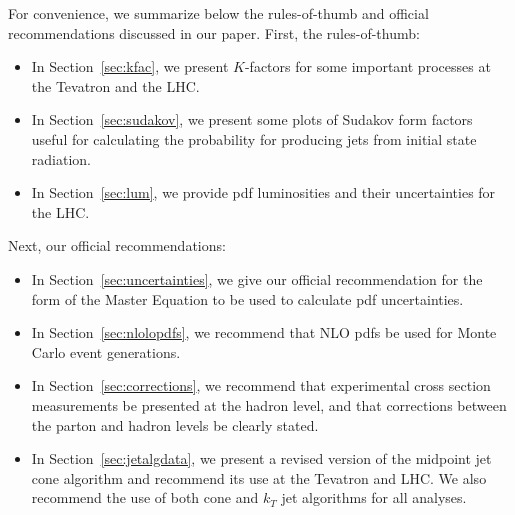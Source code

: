 \documentclass[12pt]{iopart}
\begin{document}
For convenience, we summarize below the rules-of-thumb and official recommendations discussed in our paper.
First, the rules-of-thumb:

\begin{itemize}
\item In Section~\ref{sec:kfac}, we present $K$-factors for some important processes at the Tevatron and the LHC. 

\item In Section~\ref{sec:sudakov}, we present some plots of Sudakov form factors useful for calculating the probability for producing jets from initial state radiation. 

\item In Section~\ref{sec:lum}, we provide pdf luminosities and their uncertainties for the LHC. 
\end{itemize}

Next, our official recommendations:

\begin{itemize}
\item In Section~\ref{sec:uncertainties}, we give our official recommendation for the form of the Master Equation to be used to calculate pdf uncertainties. 

\item In Section~\ref{sec:nlolopdfs}, we recommend that NLO pdfs be used for Monte Carlo event generations. 

\item In Section~\ref{sec:corrections}, we recommend that experimental cross section measurements be presented at the hadron level, and that corrections between the parton and hadron levels be clearly stated. 

\item In Section~\ref{sec:jetalgdata}, we present a revised version of the midpoint jet cone algorithm and recommend its use at the Tevatron and LHC. We also recommend the use of both cone and $k_T$ jet algorithms for all analyses.  


\end{itemize}
\end{document}
